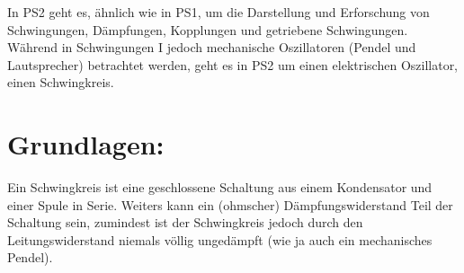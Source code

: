 \documentclass[12pt,a4paper]{article}
\begin{document}
\begin{multicols}{2}




%			




\noindent In PS2 geht es, ähnlich wie in PS1, um die Darstellung und Erforschung von Schwingungen, Dämpfungen, Kopplungen und getriebene Schwingungen.\\
Während in Schwingungen I jedoch mechanische Oszillatoren (Pendel und Lautsprecher) betrachtet werden, geht es in PS2 um einen elektrischen Oszillator, einen Schwingkreis.

\section{Grundlagen:}


Ein Schwingkreis ist eine geschlossene Schaltung aus einem Kondensator und einer Spule in Serie. Weiters kann ein (ohmscher) Dämpfungswiderstand Teil der Schaltung sein, zumindest ist der Schwingkreis jedoch durch den Leitungswiderstand niemals völlig ungedämpft (wie ja auch ein mechanisches Pendel).\\


\end{multicols}
\end{document}
